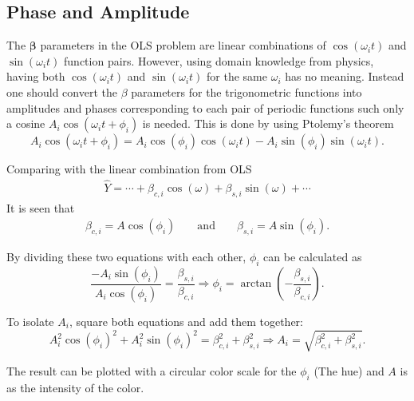 \subsection{Phase and Amplitude}

The $\mathbf{\beta}$ parameters in the OLS problem are linear combinations of $\cos(\omega_i t)$ and $\sin(\omega_i t)$ function pairs.
However, using domain knowledge from physics, having both $\cos(\omega_i t)$ and $\sin(\omega_i t)$ for the same $\omega_i$ has no meaning.
Instead one should convert the $\beta$ parameters for the trigonometric functions into amplitudes and phases corresponding to each pair of periodic functions such only a cosine  $A_i \cos(\omega_i t + \phi_i)$ is needed.
This is done by using Ptolemy's theorem
\begin{equation}
A_i \cos(\omega_i t + \phi_i) = A_i \cos(\phi_i) \cos(\omega_i t) - A_i \sin(\phi_i) \sin(\omega_i t).
\end{equation}

Comparing with the linear combination from OLS
\begin{align}
\hat{Y} = \cdots + \beta_{c,i} \cos(\omega) + \beta_{s,i} \sin(\omega) + \cdots
\end{align}
It is seen that
\begin{align}
\beta_{c,i} = A \cos(\phi_i) && \text{ and } && \beta_{s,i} = A \sin(\phi_i).
\end{align}

By dividing these two equations with each other, $\phi_i$ can be calculated as  
\begin{equation}
\frac{- A_i \sin(\phi_i)}{A_i \cos(\phi_i)} = \frac{\beta_{s,i}}{\beta_{c,i}} \Rightarrow \phi_i = \arctan\left(-\frac{\beta_{s,i}}{\beta_{c,i}}\right).
\end{equation}

To isolate $A_i$, square both equations and add them together:
\begin{equation}
A_i^2 \cos(\phi_i)^2 + A_i^2 \sin(\phi_i)^2 = \beta_{c,i}^2 + \beta_{s,i}^2 \Rightarrow A_i = \sqrt{\beta_{c,i}^2 + \beta_{s,i}^2}.
\end{equation}

The result can be plotted with a circular color scale for the $\phi_i$ (The hue) and $A$ is as the intensity of the color.
